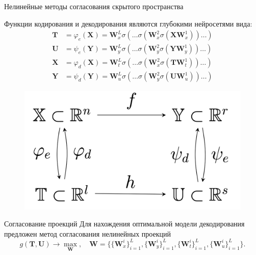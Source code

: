 \documentclass[10pt]{beamer}
\newcommand{\bT}{\mathbf{T}}
\newcommand{\bU}{\mathbf{U}}
\newcommand{\bW}{\mathbf{W}}
\newcommand{\bX}{\mathbf{X}}
\newcommand{\bY}{\mathbf{Y}}
\begin{document}
\begin{frame}{Нелинейные методы согласования скрытого пространства}
	
	\begin{minipage}{.65\linewidth}
	Функции кодирования и декодирования являются глубокими нейросетями вида:
	\begin{align*}
		\bT &= \varphi_e(\bX) =  \bW_x^L \sigma(\dots \sigma(\bW_x^2 \sigma(\bX \bW_x^1)) \dots ) \\
		\bU &= \psi_e(\bY) =  \bW_y^L \sigma(\dots \sigma(\bW_y^2 \sigma(\bY \bW_y^1)) \dots ) \\
		\bX &= \varphi_d(\bX) =  \bW_t^L \sigma(\dots \sigma(\bW_x^2 \sigma(\bT \bW_t^1)) \dots ) \\
		\bY &= \psi_d(\bY) =  \bW_u^L \sigma(\dots \sigma(\bW_y^2 \sigma(\bU \bW_u^1)) \dots )
	\end{align*}
	\vspace{-0.3cm}
	\end{minipage}%
	\begin{minipage}{.35\linewidth}
		\begin{figure}
			\includegraphics[width=1.0\linewidth]{figs/decoding_scheme}
		\end{figure}
	\end{minipage}
	\begin{block}{Согласование проекций}
		Для нахождения оптимальной модели декодирования предложен метод согласования нелинейных проекций
		\[
			g(\bT, \bU) \rightarrow \max_{\bW}, \quad \bW = \{\{\bW_x^i\}_{i=1}^L, \{\bW_y^i\}_{i=1}^L, \{\bW_t^i\}_{i=1}^L, \{\bW_u^i\}_{i=1}^L\}.
		\]
	\end{block}	
\end{frame}
\end{document}
